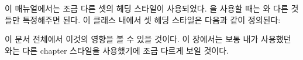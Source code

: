 이 매뉴얼에서는 조금 다른 셋의 헤딩 스타일이 사용되었다.
\cmd{\makeheadstyles}을 사용할 때는 와 다른 것들만 특정해주면 된다.
이 클래스 내에서  셋 헤딩 스타일은 다음과 같이 정의된다:
\begin{lcode}
\newcommand*{\addperiod}[1]{#1.}
\end{lcode}
이 문서 전체에서 이것의 영향을 볼 수 있을 것이다.
이 장에서는 보통 내가 사용했던 와는 다른
 chapter 스타일을 사용했기에 조금 다르게 보일 것이다.
    
